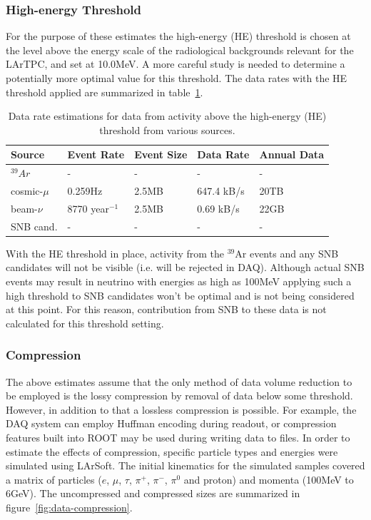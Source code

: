 \subsubsection{High-energy Threshold}

For the purpose of these estimates the  high-energy (HE) threshold is chosen at the level above 
the energy scale of the radiological backgrounds relevant for the LArTPC, and set at  10.0MeV.
A more careful study is needed to determine a potentially more optimal value for this threshold.
The data rates with the HE threshold applied are summarized in table~\ref{tab:he-volume}.

	
\begin{table}[ht!]
\centering
\begin{tabular}{| p{1.25in} | p{0.95in} | p{0.75in} | p{1in} | p{0.75in} |}		\hline	
Source & Event Rate & Event Size & Data Rate & Annual Data \\ \hline
$^{39}Ar$ & - & - & - & -\\	\hline
cosmic-$\mu$ & 0.259Hz & 2.5MB & 647.4 kB/s & 20TB \\ \hline
beam-$\nu$ & 8770 year$^{-1}$ & 2.5MB & 0.69 kB/s & 22GB \\
\hline
SNB cand. & - & - & - & -\\ \hline
\end{tabular}
\caption{Data rate estimations for data from activity above the high-energy (HE) threshold from
various sources.}
\label{tab:he-volume}
\end{table}


%

With the HE threshold in place, activity from the $^{39}$Ar events and any SNB
candidates will not be visible (i.e. will be rejected in DAQ). Although actual SNB
events may result in neutrino with energies as high as 100MeV applying such a high
threshold to SNB candidates won't be optimal and is not being considered at this point.
For this reason, contribution from SNB to these data is not calculated for this threshold setting.


\subsubsection{Compression}

The above estimates assume that the only method of data volume reduction to be employed is the
lossy compression by removal of data below some threshold. However, in addition to that
a lossless compression is possible. For example, the DAQ system can employ Huffman encoding during readout, or compression features built into ROOT may be used during writing data to files. In order to estimate
the effects of compression, specific particle types and energies were simulated using LArSoft.
The initial kinematics for the simulated samples covered a matrix of
particles ($e$, $\mu$, $\tau$, $\pi^+$, $\pi^-$, $\pi^0$ and proton) and momenta
(100MeV to 6GeV).
The uncompressed and compressed sizes are summarized in figure~\ref{fig:data-compression}.

